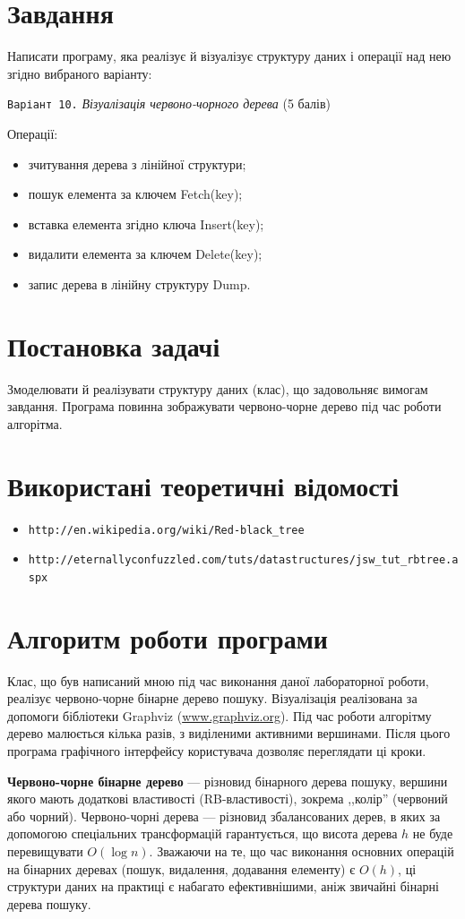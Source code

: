 \documentclass[a4paper,10pt,notitlepage,pdftex,headsepline]{scrartcl}
\begin{document}
\newpage
\tableofcontents
\newpage
\section{Завдання}
Написати програму, яка реалізує й візуалізує структуру даних і операції над нею згідно вибраного варіанту:

\texttt{Варіант 10.} \textit{Візуалізація червоно-чорного дерева} (5 балів)

Операції:
\begin{itemize}
\item зчитування дерева з лінійної структури;
\item пошук елемента за ключем Fetch(key);
\item вставка елемента згідно ключа Insert(key);
\item видалити елемента за ключем Delete(key);
\item запис дерева в лінійну структуру Dump.
\end{itemize}
\section{Постановка задачі}
Змоделювати й реалізувати структуру даних (клас), що задовольняє вимогам завдання. Програма повинна зображувати червоно-чорне дерево під час роботи алгорітма.
\section{Використані теоретичні відомості}
\begin{itemize}
\item \verb|http://en.wikipedia.org/wiki/Red-black_tree|
\item \verb|http://eternallyconfuzzled.com/tuts/datastructures/jsw_tut_rbtree.aspx|
\end{itemize}
\section{Алгоритм роботи програми}
Клас, що був написаний мною під час виконання даної лабораторної роботи, реалізує червоно-чорне бінарне дерево пошуку.
Візуалізація реалізована за допомоги бібліотеки Graphviz (\url{www.graphviz.org}).
Під час роботи алгорітму дерево малюється кілька разів, з виділеними активними вершинами.
Після цього програма графічного інтерфейсу користувача дозволяє переглядати ці кроки.

\textbf{Червоно-чорне бінарне дерево} --- різновид бінарного дерева пошуку, вершини якого мають додаткові властивості (RB-властивості), зокрема ,,колір'' (червоний або чорний).
Червоно-чорні дерева --- різновид збалансованих дерев, в яких за допомогою спеціальних трансформацій гарантується, що висота дерева $h$ не буде перевищувати $O(\log n)$.
Зважаючи на те, що час виконання основних операцій на бінарних деревах (пошук, видалення, додавання елементу) є $O(h)$, ці структури даних на практиці є набагато ефективнішими, аніж звичайні бінарні дерева пошуку.
\end{document}
